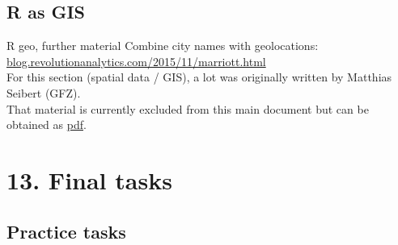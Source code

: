 \documentclass[xcolor=table,       handout,    xcolor=dvipsnames]{beamer}\usepackage[]{graphicx}\usepackage[]{color}
\begin{document}
\subsection{R as GIS}

\begin{frame}[fragile]{R geo, further material}
Combine city names with geolocations:\\ \href{http://blog.revolutionanalytics.com/2015/11/marriott.html}{blog.revolutionanalytics.com/2015/11/marriott.html}\\[1em]
For this section (spatial data / GIS), a lot was originally written by Matthias Seibert (GFZ). \\
That material is currently excluded from this main document but can be obtained as \href{https://dl.dropboxusercontent.com/u/4836866/R_course_Berry/RcourseBerry_Mathias.pdf}{pdf}.
\end{frame}

\section{13. Final tasks}

\subsection{Practice tasks}
\end{document}
